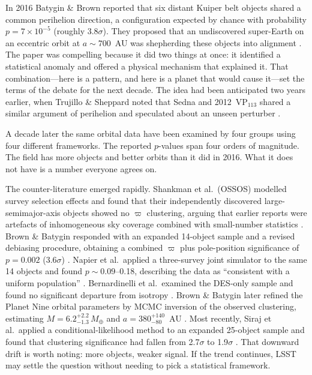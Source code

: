 \documentclass[usenatbib]{mnras}
\begin{document}
In 2016 Batygin \& Brown reported that six distant Kuiper belt objects shared a common perihelion direction, a configuration expected by chance with probability $p=7\times10^{-5}$ (roughly 3.8$\sigma$). They proposed that an undiscovered super-Earth on an eccentric orbit at $a\sim700$~AU was shepherding these objects into alignment \citep{batygin2016}. The paper was compelling because it did two things at once: it identified a statistical anomaly and offered a physical mechanism that explained it. That combination---here is a pattern, and here is a planet that would cause it---set the terms of the debate for the next decade. The idea had been anticipated two years earlier, when Trujillo \& Sheppard noted that Sedna and 2012~VP$_{113}$ shared a similar argument of perihelion and speculated about an unseen perturber \citep{trujillo2014}.

A decade later the same orbital data have been examined by four groups using four different frameworks. The reported $p$-values span four orders of magnitude. The field has more objects and better orbits than it did in 2016. What it does not have is a number everyone agrees on.

The counter-literature emerged rapidly. Shankman et al.\ (OSSOS) modelled survey selection effects and found that their independently discovered large-semimajor-axis objects showed no $\varpi$ clustering, arguing that earlier reports were artefacts of inhomogeneous sky coverage combined with small-number statistics \citep{shankman2017}. Brown \& Batygin responded with an expanded 14-object sample and a revised debiasing procedure, obtaining a combined $\varpi$ plus pole-position significance of $p=0.002$ (3.6$\sigma$) \citep{brown2019}. Napier et al.\ applied a three-survey joint simulator to the same 14 objects and found $p\sim0.09$--0.18, describing the data as ``consistent with a uniform population'' \citep{napier2021}. Bernardinelli et al.\ examined the DES-only sample and found no significant departure from isotropy \citep{bernardinelli2020}. Brown \& Batygin later refined the Planet Nine orbital parameters by MCMC inversion of the observed clustering, estimating $M = 6.2^{+2.2}_{-1.3}\,M_\oplus$ and $a = 380^{+140}_{-80}$~AU \citep{brown2021}. Most recently, Siraj et al.\ applied a conditional-likelihood method to an expanded 25-object sample and found that clustering significance had fallen from 2.7$\sigma$ to 1.9$\sigma$ \citep{siraj2025,siraj2026}. That downward drift is worth noting: more objects, weaker signal. If the trend continues, LSST may settle the question without needing to pick a statistical framework.
\end{document}
